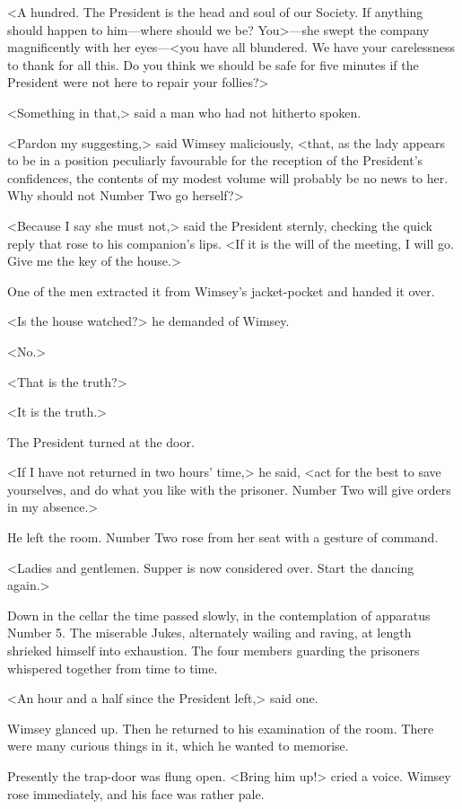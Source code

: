 <A hundred. The President is the head and soul of our Society. If anything should happen to him—where should we be? You>—she swept the company magnificently with her eyes—<you have all blundered. We have your carelessness to thank for all this. Do you think we should be safe for five minutes if the President were not here to repair your follies?>

<Something in that,> said a man who had not hitherto spoken.

<Pardon my suggesting,> said Wimsey maliciously, <that, as the lady appears to be in a position peculiarly favourable for the reception of the President's confidences, the contents of my modest volume will probably be no news to her. Why should not Number Two go herself?>

<Because I say she must not,> said the President sternly, checking the quick reply that rose to his companion's lips. <If it is the will of the meeting, I will go. Give me the key of the house.>

One of the men extracted it from Wimsey's jacket-pocket and handed it over.

<Is the house watched?> he demanded of Wimsey.

<No.>

<That is the truth?>

<It is the truth.>

The President turned at the door.

<If I have not returned in two hours' time,> he said, <act for the best to save yourselves, and do what you like with the prisoner. Number Two will give orders in my absence.>

He left the room. Number Two rose from her seat with a gesture of command.

<Ladies and gentlemen. Supper is now considered over. Start the dancing again.>

Down in the cellar the time passed slowly, in the contemplation of apparatus Number 5. The miserable Jukes, alternately wailing and raving, at length shrieked himself into exhaustion. The four members guarding the prisoners whispered together from time to time.

<An hour and a half since the President left,> said one.

Wimsey glanced up. Then he returned to his examination of the room. There were many curious things in it, which he wanted to memorise.

Presently the trap-door was flung open. <Bring him up!> cried a voice. Wimsey rose immediately, and his face was rather pale.

